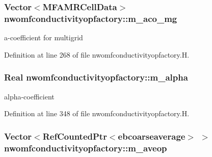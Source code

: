 \subsubsection[{\texorpdfstring{m\+\_\+aco\+\_\+mg}{m_aco_mg}}]{\setlength{\rightskip}{0pt plus 5cm}Vector$<${\bf M\+F\+A\+M\+R\+Cell\+Data}$>$ nwomfconductivityopfactory\+::m\+\_\+aco\+\_\+mg\hspace{0.3cm}{\ttfamily [protected]}}\hypertarget{classnwomfconductivityopfactory_ab0f4b31d802557fbd5c5a89516c27265}{}\label{classnwomfconductivityopfactory_ab0f4b31d802557fbd5c5a89516c27265}


a-\/coefficient for multigrid 



Definition at line 268 of file nwomfconductivityopfactory.\+H.

\subsubsection[{\texorpdfstring{m\+\_\+alpha}{m_alpha}}]{\setlength{\rightskip}{0pt plus 5cm}Real nwomfconductivityopfactory\+::m\+\_\+alpha\hspace{0.3cm}{\ttfamily [protected]}}\hypertarget{classnwomfconductivityopfactory_ad41c50b105db669141185951775139ea}{}\label{classnwomfconductivityopfactory_ad41c50b105db669141185951775139ea}


alpha-\/coefficient 



Definition at line 348 of file nwomfconductivityopfactory.\+H.

\subsubsection[{\texorpdfstring{m\+\_\+aveop}{m_aveop}}]{\setlength{\rightskip}{0pt plus 5cm}Vector$<$Ref\+Counted\+Ptr$<${\bf ebcoarseaverage}$>$ $>$ nwomfconductivityopfactory\+::m\+\_\+aveop\hspace{0.3cm}{\ttfamily [protected]}}\hypertarget{classnwomfconductivityopfactory_a199fa63abcd726660bb78331b39e033e}{}\label{classnwomfconductivityopfactory_a199fa63abcd726660bb78331b39e033e}


